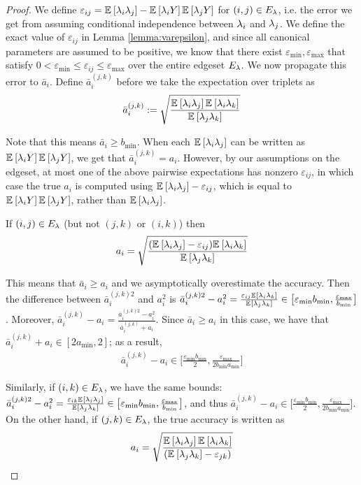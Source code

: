 \begin{proof}
We define $\varepsilon_{ij} = \mathbb{E}_{}\left[\lambda_i \lambda_j\right] - \mathbb{E}_{}\left[\lambda_i Y\right] \mathbb{E}_{}\left[\lambda_j Y\right]$ for $(i, j) \in E_{\lambda}$, i.e. the error we get from assuming conditional independence between $\lambda_i$ and $\lambda_j$. We define the exact value of $\varepsilon_{ij}$ in Lemma \ref{lemma:varepsilon}, and since all canonical parameters are assumed to be positive, we know that there exist $\varepsilon_{\min}, \varepsilon_{\max}$ that satisfy $0 < \varepsilon_{\min} \le \varepsilon_{ij} \le \varepsilon_{\max}$ over the entire edgeset $E_{\lambda}$. We now propagate this error to $\bar{a}_i$. Define $\bar{a}_i^{(j, k)}$ before we take the expectation over triplets as
\begin{align*}
\bar{a}_i^{(j, k)} := \sqrt{\frac{\mathbb{E}_{}\left[\lambda_i \lambda_j\right] \mathbb{E}_{}\left[\lambda_i \lambda_k\right]}{\mathbb{E}_{}\left[\lambda_j \lambda_k\right]}} 
\end{align*}

Note that this means $\bar{a}_i \ge b_{\min}$. When each $\mathbb{E}_{}\left[\lambda_i \lambda_j\right]$ can be written as $\mathbb{E}_{}\left[\lambda_i Y\right] \mathbb{E}_{}\left[\lambda_j Y\right]$, we get that $\bar{a}_i^{(j, k)} = a_i$. However, by our assumptions on the edgeset, at most one of the above pairwise expectations has nonzero $\varepsilon_{ij}$, in which case the true $a_i$ is computed using $\mathbb{E}_{}\left[\lambda_i \lambda_j\right] - \varepsilon_{ij}$, which is equal to $\mathbb{E}_{}\left[\lambda_i Y\right] \mathbb{E}_{}\left[\lambda_j Y\right]$, rather than $\mathbb{E}_{}\left[\lambda_i \lambda_j\right]$.

If $(i, j) \in E_{\lambda}$ (but not $(j, k)$ or $(i, k)$) then
\begin{align*}
a_i = \sqrt{\frac{(\mathbb{E}_{}\left[\lambda_i \lambda_j\right] - \varepsilon_{ij}) \mathbb{E}_{}\left[\lambda_i \lambda_k\right]}{\mathbb{E}_{}\left[\lambda_j \lambda_k\right]}}
\end{align*}

This means that $\bar{a}_i \ge a_i$ and we asymptotically overestimate the accuracy. Then the difference  between $\bar{a}_i^{(j,k) 2}$ and $a_i^2$ is
$\bar{a}_i^{(j, k) 2} - a_i^2 = \frac{\varepsilon_{ij} \mathbb{E}_{}\left[\lambda_i \lambda_k\right]}{\mathbb{E}_{}\left[\lambda_j \lambda_k\right]} \in \big[\varepsilon_{\min} b_{\min}, \frac{\varepsilon_{\max}}{b_{\min}}\big]$. Moreover, $\bar{a}_i^{(j, k)} - a_i = \frac{\bar{a}_i^{(j, k) 2} - a_i^2}{\bar{a}_i^{(j, k)} + a_i}$. Since $\bar{a}_i \ge a_i$ in this case, we have that $\bar{a}_i^{(j, k)} + a_i \in [2a_{\min}, 2]$; as a result,
\begin{align}
\bar{a}_i^{(j, k)} - a_i \in \big[ \frac{\varepsilon_{\min} b_{\min}}{2}, \frac{\varepsilon_{\max}}{2 b_{\min} a_{\min}}\big] \label{eq:acc_diff_ij}
\end{align}

Similarly, if $(i,k) \in E_{\lambda}$, we have the same bounds: $\bar{a}_i^{(j, k)2} - a_i^2 = \frac{\varepsilon_{ik} \mathbb{E}_{}\left[\lambda_i \lambda_j\right]}{\mathbb{E}_{}\left[\lambda_j \lambda_k\right]} \in \big[\varepsilon_{\min} b_{\min}, \frac{\varepsilon_{\max}}{b_{\min}}\big]$, and thus $\bar{a}_i^{(j, k)} - a_i \in \big[ \frac{\varepsilon_{\min} b_{\min}}{2}, \frac{\varepsilon_{\max}}{2 b_{\min} a_{\min}}\big]$. On the other hand, if $(j, k) \in E_{\lambda}$, the true accuracy is written as
\begin{align*}
a_i = \sqrt{\frac{\mathbb{E}_{}\left[\lambda_i \lambda_j\right] \mathbb{E}_{}\left[\lambda_i \lambda_k\right]}{(\mathbb{E}_{}\left[\lambda_j \lambda_k\right]- \varepsilon_{jk})} }
\end{align*}


\end{proof}
